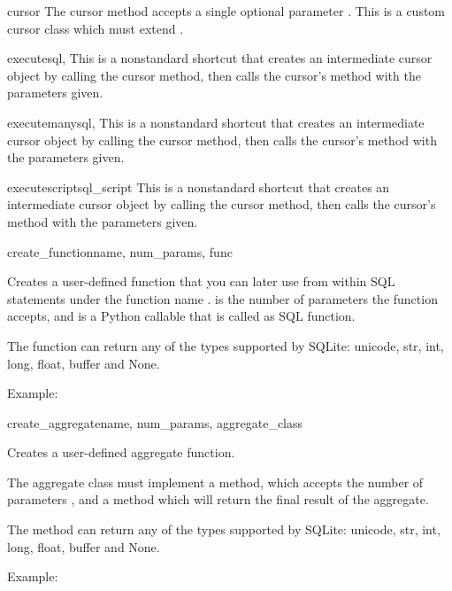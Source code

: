 \begin{methoddesc}{cursor}{}
  The cursor method accepts a single optional parameter .
  This is a custom cursor class which must extend .
\end{methoddesc}

\begin{methoddesc}{execute}{sql, }
This is a nonstandard shortcut that creates an intermediate cursor object by
calling the cursor method, then calls the cursor's  method with the
parameters given.
\end{methoddesc}

\begin{methoddesc}{executemany}{sql, }
This is a nonstandard shortcut that creates an intermediate cursor object by
calling the cursor method, then calls the cursor's  method with the
parameters given.
\end{methoddesc}

\begin{methoddesc}{executescript}{sql_script}
This is a nonstandard shortcut that creates an intermediate cursor object by
calling the cursor method, then calls the cursor's  method with the
parameters given.
\end{methoddesc}

\begin{methoddesc}{create_function}{name, num_params, func}

Creates a user-defined function that you can later use from within SQL
statements under the function name .  is the number
of parameters the function accepts, and  is a Python callable that is
called as SQL function.

The function can return any of the types supported by SQLite: unicode, str,
int, long, float, buffer and None.

Example:

  
\end{methoddesc}

\begin{methoddesc}{create_aggregate}{name, num_params, aggregate_class}

Creates a user-defined aggregate function.

The aggregate class must implement a  method, which accepts the
number of parameters , and a  method which
will return the final result of the aggregate.

The  method can return any of the types supported by SQLite:
unicode, str, int, long, float, buffer and None.

Example:

  
\end{methoddesc}

